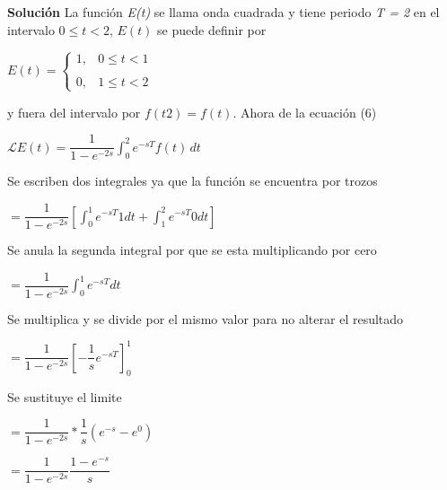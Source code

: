 \documentclass[12pt,a4paper]{article}
\begin{document}
\vspace{0.5cm}
\textbf{Solución}
La función \textit{E(t)} se llama onda cuadrada y tiene periodo \textit{T = 2} en el intervalo $ 0 \leq t <2 $, $E(t)$ se puede definir por

\vspace{0.3cm}
$E(t) =
\left\{ \begin{array}{lc}
             1, &   0 \leq t < 1 \\
             \\0, & 1 \leq t < 2
             \end{array}
\right.
$

\vspace{0.5cm}
y fuera del intervalo por $ f(t 2) = f(t)$. Ahora de la ecuación (6)

\vspace{0.4cm}
$\mathcal{L}{E(t)} = \dfrac{1}{1 - e^{-2s}}  \displaystyle\int_{0}^{2} \! e^{-sT} f(t)  \,dt$

\vspace{0.6cm}

Se escriben dos integrales ya que la función se encuentra por trozos

\hspace{1.1cm} $= \dfrac{1}{1 -e^{-2s}}[ \displaystyle\int_{0}^{1} \! e^{-sT} 1dt +  \displaystyle\int_{1}^{2} \! e^{-sT} 0dt]$ 

\vspace{0.4cm}

Se anula la segunda integral por que se esta multiplicando por cero

\hspace{1.1cm} $= \dfrac{1}{1 -e^{-2s}}  \displaystyle\int_{0}^{1} \! e^{-sT} dt$

\vspace{0.4cm}

Se multiplica y se divide por el mismo valor para no alterar el resultado

\hspace{1.1cm} $=\dfrac{1}{1 - e^{-2s}} [-\dfrac{1}{s} e^{-sT}]_{0}^{1}$

\vspace{0.4cm}

Se sustituye el limite

\hspace{1.1cm} $=\dfrac{1}{1 - e^{-2s}}*\dfrac{1}{s}(e^{-s} - e^{0})$

\hspace{1.1cm} $=\dfrac{1}{1 - e^{-2s}}\dfrac{1 - e^{-s}}{s}$
\end{document}
